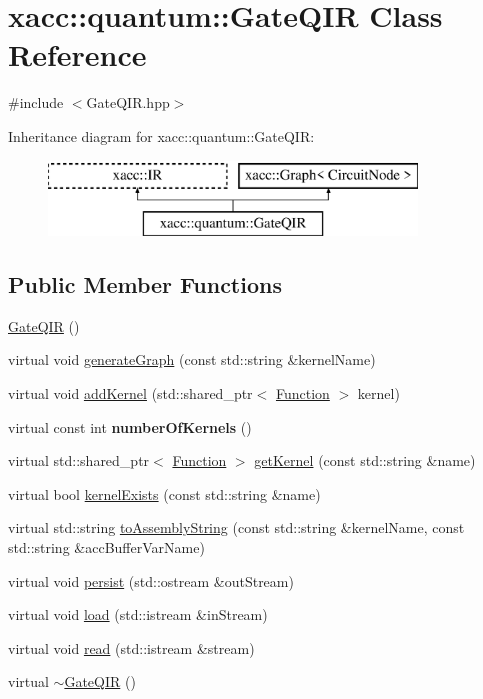 \hypertarget{a00034}{}\section{xacc\+:\+:quantum\+:\+:Gate\+Q\+IR Class Reference}
\label{a00034}


{\ttfamily \#include $<$Gate\+Q\+I\+R.\+hpp$>$}

Inheritance diagram for xacc\+:\+:quantum\+:\+:Gate\+Q\+IR\+:\begin{figure}[H]
\begin{center}
\leavevmode
\includegraphics[height=2.000000cm]{a00034}
\end{center}
\end{figure}
\subsection*{Public Member Functions}
\begin{DoxyCompactItemize}
\item 
\hyperlink{a00034_afb99f610a6b123538c659169c131a634}{Gate\+Q\+IR} ()
\item 
virtual void \hyperlink{a00034_ad1ddd6105346dd9fc78648fd812285ed}{generate\+Graph} (const std\+::string \&kernel\+Name)
\item 
virtual void \hyperlink{a00034_aa6ed2cf2cbcfec8105c327a4fa95346f}{add\+Kernel} (std\+::shared\+\_\+ptr$<$ \hyperlink{a00030}{Function} $>$ kernel)
\item 
virtual const int {\bfseries number\+Of\+Kernels} ()\hypertarget{a00034_aca6be85526b14f500e7f98954dd6da5c}{}\label{a00034_aca6be85526b14f500e7f98954dd6da5c}

\item 
virtual std\+::shared\+\_\+ptr$<$ \hyperlink{a00030}{Function} $>$ \hyperlink{a00034_a194758b6edcc3ae0c7fe8004f9bfe690}{get\+Kernel} (const std\+::string \&name)
\item 
virtual bool \hyperlink{a00034_a692f95099caa7c024110a3f035941dca}{kernel\+Exists} (const std\+::string \&name)
\item 
virtual std\+::string \hyperlink{a00034_a7153f7e9f516d43af3d5d4f95d60bd86}{to\+Assembly\+String} (const std\+::string \&kernel\+Name, const std\+::string \&acc\+Buffer\+Var\+Name)
\item 
virtual void \hyperlink{a00034_a40e1d07e4dfd3794ef53fca3cdbdca61}{persist} (std\+::ostream \&out\+Stream)
\item 
virtual void \hyperlink{a00034_a07f26eeb362ac480d20da6cdc8c8fb39}{load} (std\+::istream \&in\+Stream)
\item 
virtual void \hyperlink{a00034_a26019e2f1e13e64645e29aee86ac58b1}{read} (std\+::istream \&stream)
\item 
virtual \hyperlink{a00034_ac88db03f1dd29e2d36aaa6c01a130008}{$\sim$\+Gate\+Q\+IR} ()
\end{DoxyCompactItemize}
